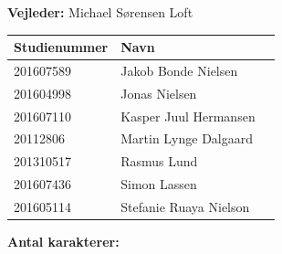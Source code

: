 \begin{center}
	\textbf{Vejleder:} Michael Sørensen Loft\\
	\vspace{5pt}
	\begin{tabular}{|l|l|l|}
		\hline
		\rowcolor{gray!50}
		\textbf{Studienummer} & \textbf{Navn}\\ [5px]
		\hline
		201607589 & Jakob Bonde Nielsen\\
		\hline
		201604998 & Jonas Nielsen\\
		\hline
		201607110 & Kasper Juul Hermansen\\
		\hline
		20112806 & Martin Lynge Dalgaard\\
		\hline
		201310517 & Rasmus Lund\\
		\hline
		201607436 & Simon Lassen\\
		\hline
		201605114 & Stefanie Ruaya Nielson\\
		\hline
	\end{tabular}

	\ifdefined\frontpageCharacters
		\vspace{10pt}
		\textbf{Antal karakterer: } \frontpageCharacters\\
	\fi
	\vspace{30pt}

\end{center}
